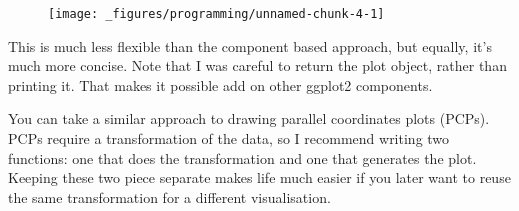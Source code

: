\begin{Shaded}
\begin{Highlighting}[]
\StringTok{ }
\StringTok{    }\NormalTok{(} \NormalTok{) +}\StringTok{ }
\StringTok{    }\NormalTok{(} \NormalTok{) +}\StringTok{ }
\StringTok{    }\NormalTok{(}\NormalTok{) +}\StringTok{ }
\StringTok{    }\NormalTok{(}\NormalTok{)}
\NormalTok{\}}
\NormalTok{(}\NormalTok{(}\NormalTok{), } 
\end{Highlighting}
\end{Shaded}

\begin{figure}[H]
  \centering
  \texttt{[image: \_figures/programming/unnamed-chunk-4-1]}
\end{figure}

This is much less flexible than the component based approach, but
equally, it's much more concise. Note that I was careful to return the
plot object, rather than printing it. That makes it possible add on
other ggplot2 components.

You can take a similar approach to drawing parallel coordinates plots
(PCPs). PCPs require a transformation of the data, so I recommend
writing two functions: one that does the transformation and one that
generates the plot. Keeping these two piece separate makes life much
easier if you later want to reuse the same transformation for a
different visualisation. 

